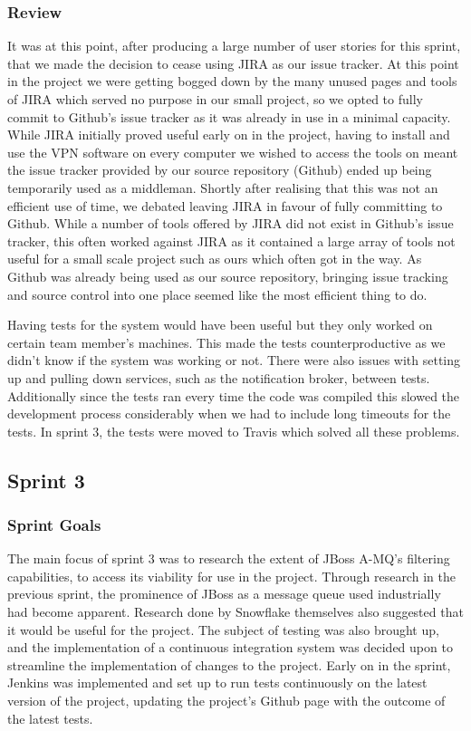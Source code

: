 \documentclass[a4paper, 12pt]{article}
\begin{document}
\subsubsection{Review}

It was at this point, after producing a large number of user stories for this sprint, that we made the decision to cease using JIRA as our issue tracker. At this point in the project we were getting bogged down by the many unused pages and tools of JIRA which served no purpose in our small project, so we opted to fully commit to Github's issue tracker as it was already in use in a minimal capacity. While JIRA initially proved useful early on in the project, having to install and use the VPN software on every computer we wished to access the tools on meant the issue tracker provided by our source repository (Github) ended up being temporarily used as a middleman. Shortly after realising that this was not an efficient use of time, we debated leaving JIRA in favour of fully committing to Github. While a number of tools offered by JIRA did not exist in Github's issue tracker, this often worked against JIRA as it contained a large array of tools not useful for a small scale project such as ours which often got in the way. As Github was already being used as our source repository, bringing issue tracking and source control into one place seemed like the most efficient thing to do.

Having tests for the system would have been useful but they only worked on certain team member's machines. This made the tests counterproductive as we didn't know if the system was working or not. There were also issues with setting up and pulling down services, such as the notification broker, between tests. Additionally since the tests ran every time the code was compiled this slowed the development process considerably when we had to include long timeouts for the tests. In sprint 3, the tests were moved to Travis which solved all these problems.

\subsection{Sprint 3}

\subsubsection{Sprint Goals}

The main focus of sprint 3 was to research the extent of JBoss A-MQ's filtering capabilities, to access its viability for use in the project. Through research in the previous sprint, the prominence of JBoss as a message queue used industrially had become apparent. Research done by Snowflake themselves also suggested that it would be useful for the project. The subject of testing was also brought up, and the implementation of a continuous integration system was decided upon to streamline the implementation of changes to the project. Early on in the sprint, Jenkins was implemented and set up to run tests continuously on the latest version of the project, updating the project's Github page with the outcome of the latest tests.
\end{document}
